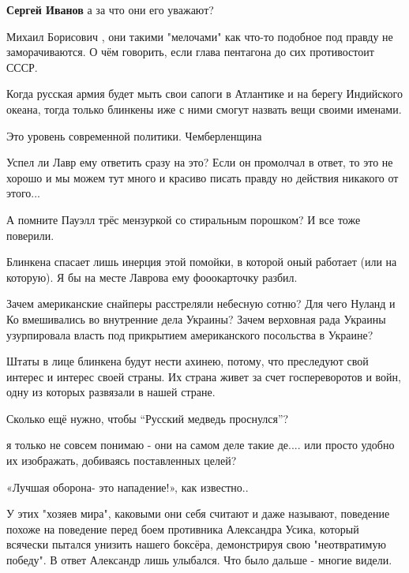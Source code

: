 \begin{itemize}
\begin{itemize}
\textbf{Сергей Иванов} а за что они его уважают?
\end{itemize} %


Михаил Борисович , они такими "мелочами" как что-то подобное под правду не заморачиваются.
О чём говорить, если глава пентагона до сих противостоит СССР.


Когда русская армия будет мыть свои сапоги в Атлантике и на берегу Индийского
океана, тогда только блинкены иже с ними смогут назвать вещи своими именами.

Это уровень современной политики. Чемберленщина


Успел ли Лавр ему ответить сразу на это? Если он промолчал в ответ, то это не
хорошо и мы можем тут много и красиво писать правду но действия никакого от
этого...


А помните Пауэлл трёс мензуркой со стиральным порошком? И все тоже поверили.

Блинкена спасает лишь инерция этой помойки, в которой оный работает (или на которую). Я бы на месте Лаврова ему фооокарточку разбил.

Зачем американские снайперы расстреляли небесную сотню?
Для чего Нуланд и Ко вмешивались во внутренние дела Украины?
Зачем верховная рада Украины узурпировала власть под прикрытием американского посольства в Украине?


Штаты в лице блинкена будут нести ахинею, потому, что преследуют свой интерес и
интерес своей страны. Их страна живет за счет госпереворотов и войн, одну из
которых развязали в нашей стране.


Сколько ещё нужно, чтобы \enquote{Русский медведь проснулся}?

я только не совсем понимаю - они на самом деле такие де.... или просто удобно их изображать, добиваясь поставленных целей?

«Лучшая оборона- это нападение!», как известно..


У этих "хозяев мира", каковыми они себя считают и даже называют, поведение
похоже на поведение перед боем противника Александра Усика, который всячески
пытался унизить нашего боксёра, демонстрируя свою "неотвратимую победу". В
ответ Александр лишь улыбался. Что было дальше - многие видели.



\end{itemize}
